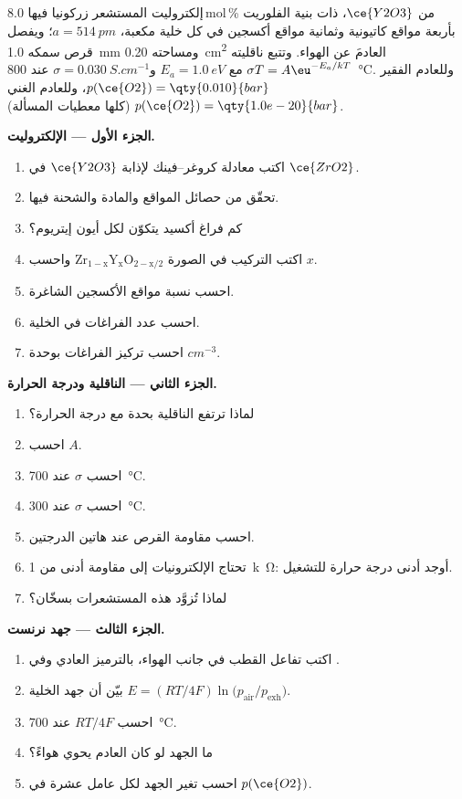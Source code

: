 \begin{problem}
\label{pb:b3:solid-state:1}
إلكتروليت المستشعر زركونيا فيها 8.0\,mol\,\% من $\ce{Y2O3}$، ذات بنية الفلوريت
بأربعة مواقع كاتيونية وثمانية مواقع أكسجين في كل خلية مكعبة، $a = \qty{514}{pm}$؛ ويفصل قرص
سمكه \qty{1.0}{mm} ومساحته \qty{0.20}{cm^2} العادمَ عن الهواء. 
وتتبع ناقليته $\sigma T = A\eu^{-E_a/kT}$ مع $E_a = \qty{1.0}{eV}$ و$\sigma = \qty{0.030}{S.cm^{-1}}$ عند \qty{800}{\celsius}. وللعادم
الفقير $p(\ce{O2}) = \qty{0.010}{bar}$، وللعادم الغني $p(\ce{O2}) = \qty{1.0e-20}{bar}$ (كلها معطيات المسألة).

\medskip\noindent\textbf{الجزء الأول --- الإلكتروليت.}
\begin{enumerate}
  \item اكتب معادلة كروغر--فينك لإذابة $\ce{Y2O3}$ في $\ce{ZrO2}$.
  \item تحقّق من حصائل المواقع والمادة والشحنة فيها.
  \item كم فراغ أكسيد يتكوّن لكل أيون إيتريوم؟
  \item اكتب التركيب في الصورة $\mathrm{Zr_{1-x}Y_xO_{2-x/2}}$ واحسب $x$.
  \item احسب نسبة مواقع الأكسجين الشاغرة.
  \item احسب عدد الفراغات في الخلية.
  \item احسب تركيز الفراغات بوحدة $\unit{cm^{-3}}$.
\end{enumerate}

\medskip\noindent\textbf{الجزء الثاني --- الناقلية ودرجة الحرارة.}
\begin{enumerate}[resume]
  \item لماذا ترتفع الناقلية بحدة مع درجة الحرارة؟
  \item احسب $A$.
  \item احسب $\sigma$ عند \qty{700}{\celsius}.
  \item احسب $\sigma$ عند \qty{300}{\celsius}.
  \item احسب مقاومة القرص عند هاتين الدرجتين.
  \item تحتاج الإلكترونيات إلى مقاومة أدنى من \qty{1}{k\ohm}: أوجد أدنى درجة حرارة
        للتشغيل.
  \item لماذا تُزوَّد هذه المستشعرات بسخّان؟
\end{enumerate}

\medskip\noindent\textbf{الجزء الثالث --- جهد نرنست.}
\begin{enumerate}[resume]
  \item اكتب تفاعل القطب في جانب الهواء، بالترميز العادي
        وفي .
  \item بيّن أن جهد الخلية $E = (RT/4F)\ln\bigl(p_{\mathrm{air}}/p_{\mathrm{exh}}\bigr)$.
  \item احسب $RT/4F$ عند \qty{700}{\celsius}.
  \item ما الجهد لو كان العادم يحوي هواءً؟
  \item احسب تغير الجهد لكل عامل عشرة في $p(\ce{O2})$.
\end{enumerate}


\end{problem}
